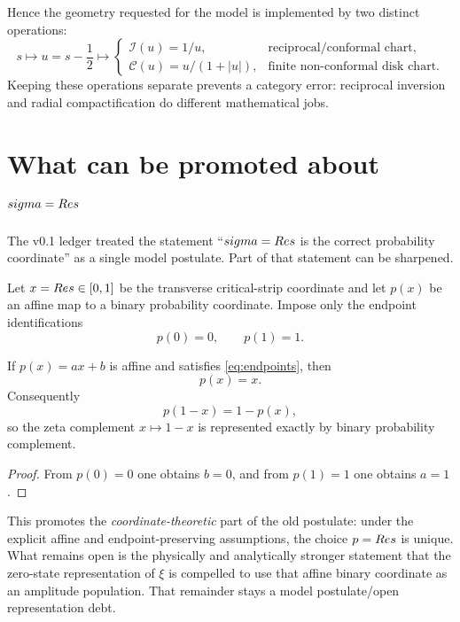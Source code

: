 Hence the geometry requested for the model is implemented by two distinct operations:
\begin{equation}
s
\longmapsto
u=s-\frac12
\longmapsto
\left\{
\begin{array}{ll}
\mathcal I(u)=1/u, & \text{reciprocal/conformal chart},\\[4pt]
\mathcal C(u)=u/(1+|u|), & \text{finite non-conformal disk chart}.
\end{array}
\right.
\end{equation}
Keeping these operations separate prevents a category error: reciprocal inversion and radial compactification do different mathematical jobs.

\section{What can be promoted about $sigma=Re s$}
The v0.1 ledger treated the statement ``$sigma=Re s$ is the correct probability coordinate'' as a single model postulate.  Part of that statement can be sharpened.

Let $x=Re s\in[0,1]$ be the transverse critical-strip coordinate and let $p(x)$ be an affine map to a binary probability coordinate.  Impose only the endpoint identifications
\begin{equation}
p(0)=0,
\qquad
p(1)=1.
\label{eq:endpoints}
\end{equation}

\begin{theorem}
\label{thm:affine-strip-simplex}
If $p(x)=ax+b$ is affine and satisfies \eqref{eq:endpoints}, then
\begin{equation}
p(x)=x.
\end{equation}
Consequently
\begin{equation}
p(1-x)=1-p(x),
\end{equation}
so the zeta complement $x\mapsto1-x$ is represented exactly by binary probability complement.
\end{theorem}

\begin{proof}
From $p(0)=0$ one obtains $b=0$, and from $p(1)=1$ one obtains $a=1$.
\end{proof}

This promotes the \emph{coordinate-theoretic} part of the old postulate: under the explicit affine and endpoint-preserving assumptions, the choice $p=Re s$ is unique.  What remains open is the physically and analytically stronger statement that the zero-state representation of $\xi$ is compelled to use that affine binary coordinate as an amplitude population.  That remainder stays a model postulate/open representation debt.

